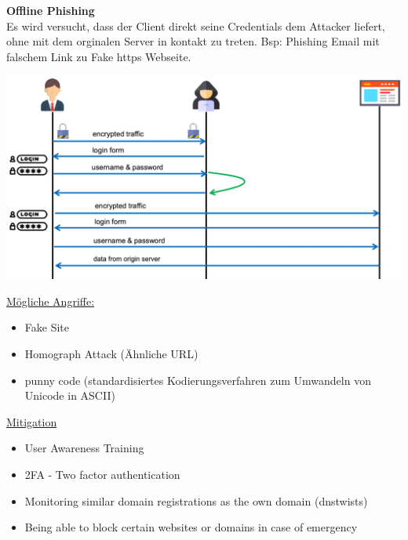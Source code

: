 \textbf{Offline Phishing}\\
Es wird versucht, dass der Client direkt seine Credentials dem Attacker liefert, ohne mit dem orginalen Server in kontakt zu treten. Bsp: Phishing Email mit falschem Link zu Fake https Webseite.
\begin{center}
    \vspace{-8pt}
    \includegraphics[width=.8\linewidth]{./img/09-mitm/fake_https_page}
    \vspace{-8pt}
\end{center}
\underline{Mögliche Angriffe:}
\begin{itemize}
    \item Fake Site
    \item Homograph Attack (Ähnliche URL)
    \item punny code (standardisiertes Kodierungsverfahren zum Umwandeln von Unicode in ASCII)
\end{itemize}
\underline{Mitigation}
\begin{itemize}
    \item User Awareness Training
    \item 2FA - Two factor authentication
    \item Monitoring similar domain registrations as the own domain (dnstwists)
    \item Being able to block certain websites or domains in case of emergency
\end{itemize}

\newpage

